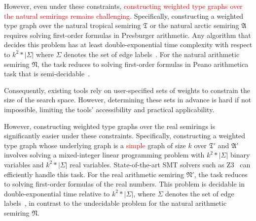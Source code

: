 However, even under these constraints, \textcolor{red}{constructing weighted type graphs over the natural semirings remains challenging.} Specifically, constructing a weighted type graph over the natural tropical semiring $\mathfrak{T}$ or the natural arctic semiring $\mathfrak{A}$ requires solving first-order formulas in Presburger arithmetic. Any algorithm that decides this problem has at least double-exponential time complexity with respect to $k^2 * | \Sigma |$ where \( \Sigma \) denotes the set of edge labels~\cite{fischer1998super}. For the natural arithmetic semiring $\mathfrak{N}$, the task reduces to solving first-order formulas in Peano arithmetic\textemdash a task that is semi-decidable~\cite{matiyasevivc2003enumerable}.

Consequently, existing tools rely on user-specified sets of weights to constrain the size of the search space. However, determining these sets in advance is hard if not impossible, limiting the tools' accessibility and practical applicability.
 
However, constructing weighted type graphs over the real semirings is significantly easier under these constraints.
Specifically, constructing a weighted type graph whose underlying graph is a \textcolor{red}{simple} graph of size \( k \) over $\mathfrak{T}'$ and $\mathfrak{A}'$ involves solving a mixed-integer linear programming problem with $k^2 * | \Sigma |$ binary variables and $k^2 * | \Sigma |$ real variables.
State-of-the-art SMT solvers such as Z3~\cite{de2008z3} can efficiently handle this task.
For the real arithmetic semiring $\mathfrak{N}'$, the task reduces to solving first-order formulas of the real numbers. This problem is decidable in double-exponential time
relative to $k^2 * | \Sigma |$, where
\( \Sigma \) denotes the set of edge labels~\cite{collins1974quantifier}, in contrast to the undecidable problem for the natural arithmetic semiring $\mathfrak{N}$.

